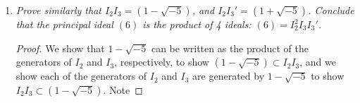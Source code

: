\documentclass[10pt,oneside,reqno]{amsart}
\theoremstyle{plain}
\theoremstyle{definition}
\begin{document}
\begin{enumerate}
\begin{enumerate}
\begin{proof}
Let $\alpha,\beta$ be arbitrary elements of $I_2$, where $\alpha = 2a + (1 + \sqrt{-5})b$, and $\beta = 2c + (1 + \sqrt{-5})d$, for $a,b,c,d \in \mathbb{Z}$.  Then any element of $I_2^2$ is of the form 
\begin{equation} 
\begin{aligned}
\alpha\beta &= (2a + (1 + \sqrt{-5})b)(2c + (1 + \sqrt{-5})d)\\
&= 4ac + 2ad(1 + \sqrt{-5}) + 2cb(1 + \sqrt{-5}) +  bd(1 + 2\sqrt{-5} + -5)\\
&= 4ac + 2ad + 2ad\sqrt{-5} + 2cb + 2cb\sqrt{-5}  + 2bd\sqrt{-5} - 4bd\\
&= 2(2ac + ad + ad\sqrt{-5} + cb + cb\sqrt{-5}  + bd\sqrt{-5} - 2bd)\\
&= 2((2ac + ad + cb -2bd) + (ad + cb + bd)\sqrt{-5}),
\end{aligned}
\end{equation}

and since $a,b,c,d$ are integers, we know that $\alpha\beta$ is of the form $2r$ for $r \in R$. Thus $I_2^2 = (2)$, since for appropriate choice of $a,b,c,d$ we may let $r$ be any element of $R$. Hence $I_2^2$ is a principal ideal. 
\end{proof}

\item \textit{Prove similarly that $I_2I_3 = (1 - \sqrt{-5})$, and $I_2I_3' = (1 + \sqrt{-5})$. Conclude that the principal ideal $(6)$ is the product of 4 ideals: $(6) = I_2^2I_3I_3'$. }

\begin{proof}
We show that $1 - \sqrt{-5}$ can be written as the product of the generators of $I_2$ and $I_3$, respectively, to show $(1 - \sqrt{-5}) \subset I_2I_3$, and we show each of the generators of $I_2$ and $I_3$ are generated by $1 - \sqrt{-5}$ to show $I_2I_3 \subset (1 - \sqrt{-5})$. Note 


\end{proof}
\end{enumerate}
\end{enumerate}
\end{document}
